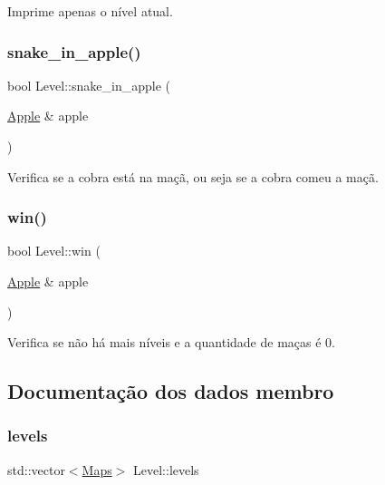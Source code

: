 Imprime apenas o nível atual. 

\mbox{\label{classLevel_a6956ffc5e9752ef3510268d839951218}} 
\subsubsection{\texorpdfstring{snake\+\_\+in\+\_\+apple()}{snake\_in\_apple()}}
{\footnotesize\ttfamily bool Level\+::snake\+\_\+in\+\_\+apple (\begin{DoxyParamCaption}\item[{\hyperlink{classApple}{Apple} \&}]{apple }\end{DoxyParamCaption})\hspace{0.3cm}{\ttfamily [inline]}}



Verifica se a cobra está na maçã, ou seja se a cobra comeu a maçã. 

\mbox{\label{classLevel_a84ae9945f973c39236b08a50b0ec878f}} 
\subsubsection{\texorpdfstring{win()}{win()}}
{\footnotesize\ttfamily bool Level\+::win (\begin{DoxyParamCaption}\item[{\hyperlink{classApple}{Apple} \&}]{apple }\end{DoxyParamCaption})\hspace{0.3cm}{\ttfamily [inline]}}



Verifica se não há mais níveis e a quantidade de maças é 0. 



\subsection{Documentação dos dados membro}
\mbox{\label{classLevel_a8b1c3287f0f55ae114562e9aaa0914c4}} 
\subsubsection{\texorpdfstring{levels}{levels}}
{\footnotesize\ttfamily std\+::vector$<$\hyperlink{classMaps}{Maps}$>$ Level\+::levels\hspace{0.3cm}{\ttfamily [private]}}



